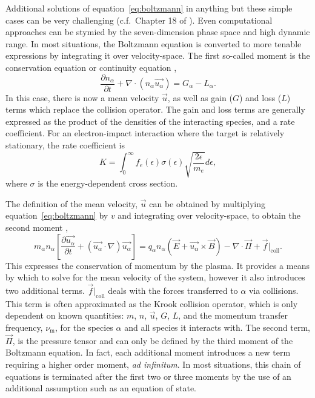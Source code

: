 Additional solutions of equation~\ref{eq:boltzmann} in anything but these simple
cases can be very challenging (c.f.\ Chapter 18 of \cite{Lieberman2005}). Even
computational approaches can be stymied by the seven-dimension phase space and
high dynamic range. In most situations, the Boltzmann equation is converted to
more tenable expressions by integrating it over velocity-space. The first
so-called moment is the conservation equation or continuity equation
\cite{Lieberman2005},
\begin{equation}\label{eq:cont}
  \frac{\partial n_\alpha}{\partial t} + \nabla \cdot (n_\alpha \vec{u_\alpha})
  = G_\alpha - L_\alpha.
\end{equation}
In this case, there is now a mean velocity $\vec{u}$, as well as gain ($G$) and
loss ($L$) terms which replace the collision operator. The gain and loss terms
are generally expressed as the product of the densities of the interacting
species, and a rate coefficient. For an electron-impact interaction where the
target is relatively stationary, the rate coefficient is
\begin{equation}
  K = \int_0^\infty f_e(\epsilon)\sigma(\epsilon)
      \sqrt{\frac{2\epsilon}{m_e}}d\epsilon,
  \label{eq:rate}
\end{equation}
where $\sigma$ is the energy-dependent cross section.

The definition of the mean velocity, $\vec{u}$ can be obtained by multiplying
equation~\ref{eq:boltzmann} by $v$ and integrating over velocity-space, to
obtain the second moment \cite{Lieberman2005},
\begin{equation}
  m_\alpha n_\alpha \left[ \frac{\partial \vec{u_\alpha}}{\partial t}
  + (\vec{u_\alpha} \cdot \nabla) \vec{u_\alpha}\right]
  = q_\alpha n_\alpha (\vec{E} + \vec{u_\alpha} \times \vec{B})
  - \nabla \cdot \vec{\Pi} + \vec{f}|_\mathrm{coll}.
  \label{eq:momentum}
\end{equation}
This expresses the conservation of momentum by the plasma. It provides a means
by which to solve for the mean velocity of the system, however it also
introduces two additional terms. $\vec{f}|_\mathrm{coll}$ deals with the forces
transferred to $\alpha$ via collisions. This term is often approximated as the
Krook collision operator, which is only dependent on known quantities: $m$, $n$,
$\vec{u}$, $G$, $L$, and the momentum transfer frequency, $\nu_\mathrm{m}$, for
the species $\alpha$ and all species it interacts with. The second term,
$\vec{\Pi}$, is the pressure tensor and can only be defined by the third moment
of the Boltzmann equation. In fact, each additional moment introduces a new term
requiring a higher order moment, \emph{ad infinitum}. In most situations, this
chain of equations is terminated after the first two or three moments by the use
of an additional assumption such as an equation of state.


